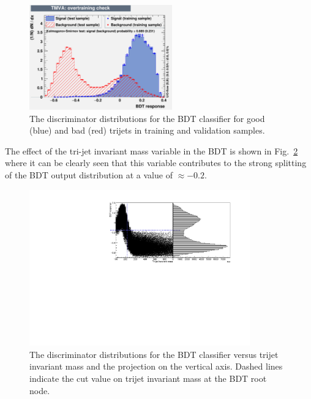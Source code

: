 \begin{figure}[ht!]
\begin{center}
    \includegraphics[width=0.55\textwidth]{images/Run2/overtrain_BDT.pdf}
    \caption{The discriminator distributions for the BDT classifier for good (blue) and bad (red) trijets in training and validation samples.}
    \label{fig:TrijetBDTOutput13}
\end{center}
\end{figure}

The effect of the tri-jet invariant mass variable in the BDT is shown in Fig.~\ref{fig:multimode13} where it can be clearly seen that this variable contributes to the strong splitting of the BDT output distribution at a value of $\approx-0.2$.

\begin{figure}[ht!]
\begin{center}
    \includegraphics[width=0.85\textwidth]{images/Run2/multimode.pdf}
    \caption{The discriminator distributions for the BDT classifier versus trijet invariant mass and the projection on the vertical axis. Dashed lines indicate the cut value on trijet invariant mass at the BDT root node.}
    \label{fig:multimode13}
\end{center}
\end{figure}

